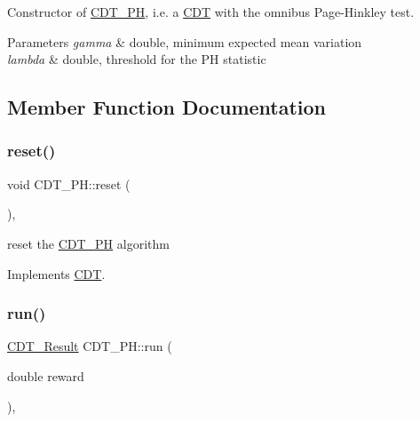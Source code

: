 Constructor of \mbox{\hyperlink{class_c_d_t___p_h}{C\+D\+T\+\_\+\+PH}}, i.\+e. a \mbox{\hyperlink{class_c_d_t}{C\+DT}} with the omnibus Page-\/\+Hinkley test. 


\begin{DoxyParams}{Parameters}
{\em gamma} & double, minimum expected mean variation \\
\hline
{\em lambda} & double, threshold for the PH statistic \\
\hline
\end{DoxyParams}


\subsection{Member Function Documentation}
\mbox{\label{class_c_d_t___p_h_adace7acacaeb66d3d2a292ccb69ac821}} 
\subsubsection{\texorpdfstring{reset()}{reset()}}
{\footnotesize\ttfamily void C\+D\+T\+\_\+\+P\+H\+::reset (\begin{DoxyParamCaption}{ }\end{DoxyParamCaption})\hspace{0.3cm}{\ttfamily [override]}, {\ttfamily [virtual]}}



reset the \mbox{\hyperlink{class_c_d_t___p_h}{C\+D\+T\+\_\+\+PH}} algorithm 



Implements \mbox{\hyperlink{class_c_d_t_a46446ec219a819466ff418d9ab7aa728}{C\+DT}}.

\mbox{\label{class_c_d_t___p_h_a58f56f0997012d0f350cc5721ef8a9e0}} 
\subsubsection{\texorpdfstring{run()}{run()}}
{\footnotesize\ttfamily \mbox{\hyperlink{class_c_d_t___result}{C\+D\+T\+\_\+\+Result}} C\+D\+T\+\_\+\+P\+H\+::run (\begin{DoxyParamCaption}\item[{double}]{reward }\end{DoxyParamCaption})\hspace{0.3cm}{\ttfamily [override]}, {\ttfamily [virtual]}}



